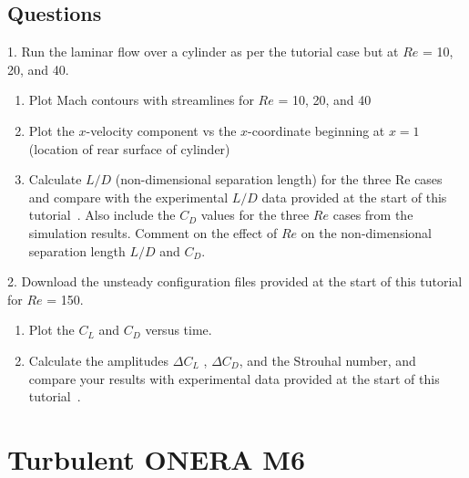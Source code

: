\section*{Questions}
1. Run the laminar flow over a cylinder as per the tutorial case but at $Re$ = 10, 20, and 40.
\begin{enumerate}[label=(\alph*)]
    \item Plot Mach contours with streamlines for $Re$ = 10, 20, and 40
    \item Plot the $x$-velocity component vs the $x$-coordinate beginning at $x = 1$ (location of rear surface of cylinder)
    \item Calculate $L/D$ (non-dimensional separation length) for the three Re cases and compare with the experimental $L/D$ data provided at the start of this tutorial~\cite{coutanceau1977experimental}. Also include the $C_D$ values for the three $Re$ cases from the simulation results. Comment on the effect of $Re$ on the non-dimensional separation length $L/D$ and $C_D$.
\end{enumerate}
2. Download the unsteady configuration files provided at the start of this tutorial for $Re$ = 150.
\begin{enumerate}[label=(\alph*)]
    \item Plot the $C_L$ and $C_D$ versus time.
    \item Calculate the amplitudes $\Delta C_L$ , $\Delta C_D$, and the Strouhal number, and compare your results with experimental data provided at the start of this tutorial~\cite{inoue2002sound}.
\end{enumerate}
\chapter{Turbulent ONERA M6}
\label{ch:Turbulent ONERA M6}
